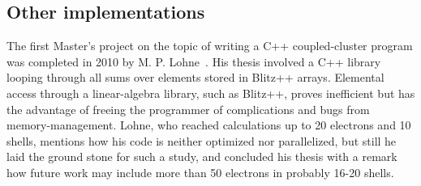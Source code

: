 \begin{table}
\begin{center}
\caption{Time used by Goto's and Netlib's blas multiplying two square matrices, for different levels of Strassen splitting.}
\hspace{20mm}
\end{center}
\end{table}





\subsection{Other implementations}
The first Master's project on the topic of writing a C++ coupled-cluster program was completed in 2010 by M. P. Lohne~\cite{mplohne}.
His thesis involved a C++ library looping through all sums over elements stored in Blitz++ arrays.
Elemental access through a linear-algebra library, such as Blitz++, proves inefficient but has the advantage of freeing the programmer of complications and bugs from memory-management.
Lohne, who reached calculations up to 20 electrons and 10 shells, mentions how his code is neither optimized nor parallelized, but still he laid the ground stone for such a study, and concluded his thesis with a remark how future work may include more than 50 electrons in probably 16-20 shells.

